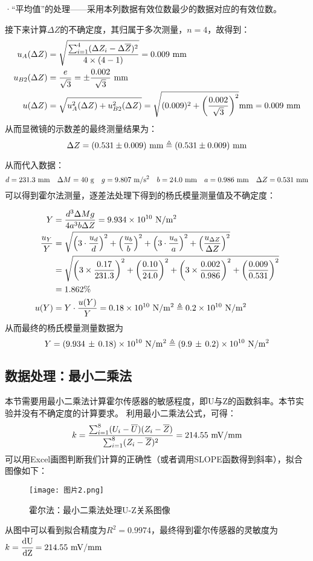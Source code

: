 \documentclass[11pt]{article}
\begin{document}
·“平均值”的处理——采用本列数据有效位数最少的数据对应的有效位数。
\bigskip

接下来计算$\Delta Z$的不确定度，其归属于多次测量，$n=4$，故得到：
\begin{align*}
     u_A(\Delta Z)&=\sqrt{\frac{\sum_{i=1}^4(\Delta Z_i-\Delta \overline  Z)^2}{4\times(4-1)}}
    =0.009\,\,{\rm mm}\\
     u_{B2}(\Delta Z)&=\frac{e}{\sqrt 3}=
    \pm \frac{0.002}{\sqrt 3} \,\,{\rm mm}\\
     u(\Delta Z)&=
    \sqrt{u_{A}^2(\Delta Z)+u^2_{B2}(\Delta Z)} =\sqrt{(0.009)^2+\left(\frac{0.002}{\sqrt3 }\right)^2}{\rm mm}
    =0.009 \,\,{\rm mm}
\end{align*}
从而显微镜的示数差的最终测量结果为：
\[
  \Delta Z=  (0.531\pm 0.009)\,\,{\rm mm}\triangleq  (0.531\pm 0.009)\,\,{\rm mm}
\]


从而代入数据：
\[
    d=231.3\,\,{\rm mm} \quad \Delta M=40\,\,{\rm g}\quad 
    g=9.807\,\,{\rm m/s^2}\quad b=24.0\,\,{\rm mm}
    \quad  a=0.986\,\,{\rm mm}
    \quad \Delta Z=0.531\,\,{\rm mm}
\]
可以得到霍尔法测量，逐差法处理下得到的杨氏模量测量值及不确定度：

\begin{align*}
         Y&=\frac{d^3\Delta M g}{4a^3b\Delta Z}=9.934\times 10^{10}\,\,{\rm N/m^2}\\
        \frac{u_Y}{Y}&=\sqrt{\left(3\cdot\frac{u_d}{d}\right)^2+\left(\frac{u_b}{b}\right)^2
        +\left(3\cdot\frac{u_a}{a}\right)^2+\left(\frac{u_{\Delta Z}}{\Delta Z}\right)^2}
        \\ &=\sqrt{
            \left(3\times\frac{ 0.17}{231.3}\right)^2
            +\left(\frac{0.10}{24.0}\right)^2
        +\left(3\times\frac{ 0.002}{0.986}\right)^2
        +\left(\frac{0.009}{0.531}\right)^2}
        \\ & =1.862\%
        \\ u(Y)&=Y\cdot\frac{u(Y)}{Y}=0.18\times 10^{10}\,\,{\rm N/m^2}\triangleq0.2\times10^{10}\,\,{\rm N/m^2}
\end{align*}
从而最终的杨氏模量测量数据为
\[
    Y=(9.934\,\pm\,0.18) \times10^{10}\,\,{\rm N/m^2}\triangleq (9.9\,\pm \,0.2)\times10^{10}\,\,{\rm N/m^2}
\]





\subsection{数据处理：最小二乘法}

本节需要用最小二乘法计算霍尔传感器的敏感程度，即U与Z的函数斜率。本节实验并没有不确定度的计算要求。
利用最小二乘法公式，可得：
\[
    k=\frac{\sum_{i=1}^8(U_i-\overline U)(Z_i-\overline Z)}
    {\sum_{i=1}^8(Z_i-\overline Z)^2}=214.55\,\, {\rm mV/mm}
\]
可以用Excel画图判断我们计算的正确性（或者调用SLOPE函数得到斜率），拟合图像如下：
\begin{figure}[H]
    \centering
    \texttt{[image: 图片2.png]}
    \caption{霍尔法：最小二乘法处理U-Z关系图像}
\end{figure}
从图中可以看到拟合精度为$R^2=0.9974$，最终得到霍尔传感器的灵敏度为$k=\cfrac{\rm dU}{\rm dZ}=214.55\,\, {\rm mV/mm}$
\end{document}
